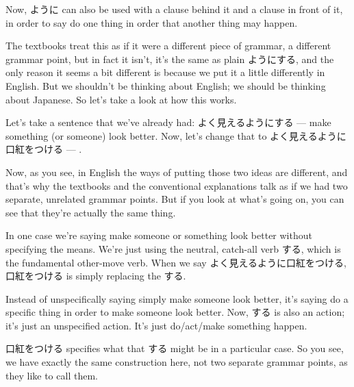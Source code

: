 \stopsectionlevel

\startsectionlevel[title={Cause-and-effect usage of ように},reference={cause-and-effect-usage-of-ように}]

Now, ように can also be used with a clause behind it and a clause in front of it, in order to say do one thing in order that another thing may happen.

{}

The textbooks treat this as if it were a different piece of grammar, a different grammar point, but in fact it isn't, it's the same as plain ようにする, and the only reason it seems a bit different is because we put it a little differently in English. But we shouldn't be thinking about English; we should be thinking about Japanese. So let's take a look at how this works.

Let's take a sentence that we've already had: よく見えるようにする --- make something (or someone) look better. Now, let's change that to よく見えるように口紅をつける --- .

{}

Now, as you see, in English the ways of putting those two ideas are different, and that's why the textbooks and the conventional explanations talk as if we had two separate, unrelated grammar points. But if you look at what's going on, you can see that they're actually the same thing.

In one case we're saying make someone or something look better without specifying the means. We're just using the neutral, catch-all verb する, which is the fundamental other-move verb. When we say よく見えるように口紅をつける, 口紅をつける is simply replacing the する.

Instead of unspecifically saying simply make someone look better, it's saying do a specific thing in order to make someone look better. Now, する is also an action; it's just an unspecified action. It's just do/act/make something happen.

口紅をつける specifies what that する might be in a particular case. So you see, we have exactly the same construction here, not two separate grammar points, as they like to call them.

\stopsectionlevel

\startsectionlevel[title={ように at the end of a sentence},reference={ように-at-the-end-of-a-sentence}]


